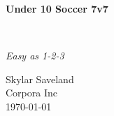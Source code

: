 
\clearpage
\vspace*{1.5in}
\begin{center}
  \begin{minipage}{\textwidth}
    \centering
    \Huge\bfseries
    \linespread{1.25}\selectfont
  Under 10 Soccer 7v7
  \end{minipage}
  \\[3em]
  {\Large\itshape\linespread{1.3}\selectfont
  Easy as 1-2-3\par}
  \vfill
  {\large Skylar Saveland}
  \\[1em]
  {\large Corpora Inc}
  \\[1em]
  {\large \today}
\end{center}
\clearpage

